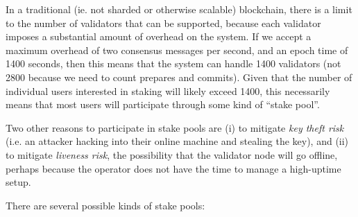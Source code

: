 \documentclass[12pt]{article}
\begin{document}
In a traditional (ie. not sharded or otherwise scalable) blockchain, there is a limit to the number of validators that can be supported, because each validator imposes a substantial amount of overhead on the system. If we accept a maximum overhead of two consensus messages per second, and an epoch time of 1400 seconds, then this means that the system can handle 1400 validators (not 2800 because we need to count prepares and commits). Given that the number of individual users interested in staking will likely exceed 1400, this necessarily means that most users will participate through some kind of ``stake pool''.

Two other reasons to participate in stake pools are (i) to mitigate \textit{key theft risk} (i.e. an attacker hacking into their online machine and stealing the key), and (ii) to mitigate \textit{liveness risk}, the possibility that the validator node will go offline, perhaps because the operator does not have the time to manage a high-uptime setup.

There are several possible kinds of stake pools:
\end{document}
